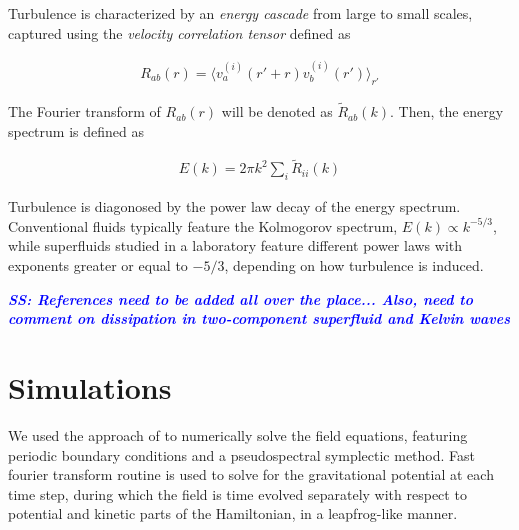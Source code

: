 \documentclass[onecolumn,nofootinbib,superscriptaddress]{revtex4}
\newcommand{\stst}[1]{\textcolor{blue}{\it{\textbf{SS: #1}}} }
\begin{document}
Turbulence is characterized by an \textit{energy cascade} from large to small scales, captured using the \textit{velocity correlation tensor} defined as

\begin{align}
R_{a b}(r) = \langle v^{(i)}_a(r' + r) v^{(i)}_b(r') \rangle_{r'}
\end{align}
 
The Fourier transform of $R_{a b}(r)$ will be denoted as $\tilde{R}_{a b}(k)$. Then, the energy spectrum is defined as

\begin{align}
E(k) = 2 \pi k^2 \sum_i \tilde{R}_{i i}(k) 
\end{align}

Turbulence is diagonosed by the power law decay of the energy spectrum. Conventional fluids typically feature the Kolmogorov spectrum, $E(k) \propto k^{-5/3}$, while superfluids studied in a laboratory feature different power laws with exponents greater or equal to $-5/3$, depending on how turbulence is induced.

\stst{References need to be added all over the place... Also, need to comment on dissipation in two-component superfluid and Kelvin waves}


\section{Simulations}

We used the approach of \cite{Mocz:2017wlg} to numerically solve the field equations, featuring periodic boundary conditions and a pseudospectral symplectic method. Fast fourier transform routine is used to solve for the gravitational potential at each time step, during which the field is time evolved separately with respect to potential and kinetic parts of the Hamiltonian, in a leapfrog-like manner. 
\end{document}
